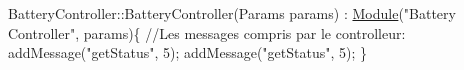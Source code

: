 \begin{DoxyCode}
BatteryController::BatteryController(Params params) : \hyperlink{classModule}{Module}(\textcolor{stringliteral}{"Battery Controller"}, params)\{
    \textcolor{comment}{//Les messages compris par le controlleur:}
    addMessage(\textcolor{stringliteral}{"getStatus"}, 5);
    addMessage(\textcolor{stringliteral}{"getStatus"}, 5);
\}
\end{DoxyCode}
 